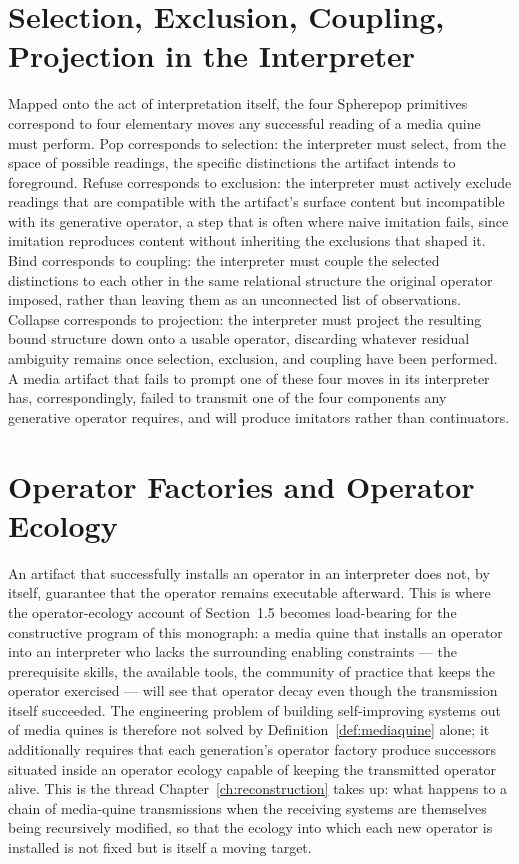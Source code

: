 \documentclass[11pt]{book}
\begin{document}
\section{Selection, Exclusion, Coupling, Projection in the Interpreter}

Mapped onto the act of interpretation itself, the four Spherepop primitives correspond to four elementary moves any successful reading of a media quine must perform. Pop corresponds to selection: the interpreter must select, from the space of possible readings, the specific distinctions the artifact intends to foreground. Refuse corresponds to exclusion: the interpreter must actively exclude readings that are compatible with the artifact's surface content but incompatible with its generative operator, a step that is often where naive imitation fails, since imitation reproduces content without inheriting the exclusions that shaped it. Bind corresponds to coupling: the interpreter must couple the selected distinctions to each other in the same relational structure the original operator imposed, rather than leaving them as an unconnected list of observations. Collapse corresponds to projection: the interpreter must project the resulting bound structure down onto a usable operator, discarding whatever residual ambiguity remains once selection, exclusion, and coupling have been performed. A media artifact that fails to prompt one of these four moves in its interpreter has, correspondingly, failed to transmit one of the four components any generative operator requires, and will produce imitators rather than continuators.

\section{Operator Factories and Operator Ecology}

An artifact that successfully installs an operator in an interpreter does not, by itself, guarantee that the operator remains executable afterward. This is where the operator-ecology account of Section~1.5 becomes load-bearing for the constructive program of this monograph: a media quine that installs an operator into an interpreter who lacks the surrounding enabling constraints --- the prerequisite skills, the available tools, the community of practice that keeps the operator exercised --- will see that operator decay even though the transmission itself succeeded. The engineering problem of building self-improving systems out of media quines is therefore not solved by Definition~\ref{def:mediaquine} alone; it additionally requires that each generation's operator factory produce successors situated inside an operator ecology capable of keeping the transmitted operator alive. This is the thread Chapter~\ref{ch:reconstruction} takes up: what happens to a chain of media-quine transmissions when the receiving systems are themselves being recursively modified, so that the ecology into which each new operator is installed is not fixed but is itself a moving target.
\end{document}
